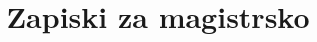 \documentclass[12pt,a4paper]{article}
\begin{document}
\title{\LARGE{Zapiski za magistrsko}}
\maketitle

\end{document}
